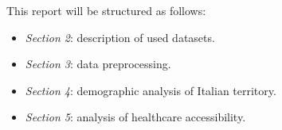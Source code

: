 This report will be structured as follows:
\begin{itemize}
	\item \emph{Section 2}: description of used datasets.
	\item \emph{Section 3}: data preprocessing.
	\item \emph{Section 4}: demographic analysis of Italian territory.
	\item \emph{Section 5}: analysis of healthcare accessibility.
\end{itemize}